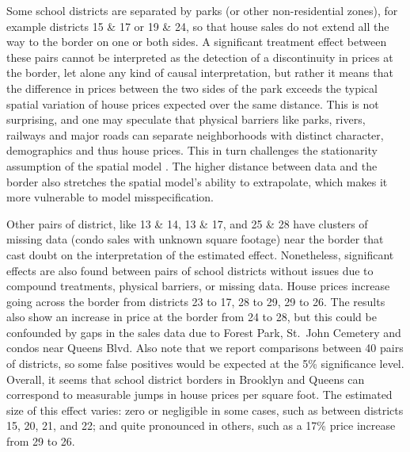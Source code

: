    Some school districts are separated by parks (or other non-residential zones), for example districts 15 \& 17 or 19 \& 24, so that house sales do not extend all the way to the border on one or both sides.
A significant treatment effect between these pairs cannot be interpreted as the detection of a discontinuity in prices at the border, let alone any kind of causal interpretation, but rather it means that the difference in prices between the two sides of the park exceeds the typical spatial variation of house prices expected over the same distance.
This is not surprising, and one may speculate that physical barriers like parks, rivers, railways and major roads can separate neighborhoods with distinct character, demographics and thus house prices.
This in turn challenges the stationarity assumption of the spatial model .
The higher distance between data and the border also stretches the spatial model's ability to extrapolate, which makes it more vulnerable to model misspecification.

    Other pairs of district, like 13 \& 14, 13 \& 17, and 25 \& 28 have clusters of missing data (condo sales with unknown square footage) near the border that cast doubt on the interpretation of the estimated effect.
Nonetheless, significant effects are also found between pairs of school districts without issues due to compound treatments, physical barriers, or missing data.
House prices increase going across the border from districts 23 to 17, 28 to 29, 29 to 26.
The results also show an increase in price at the border from 24 to 28, but this could be confounded by gaps in the sales data due to Forest Park, St.~John Cemetery and condos near Queens Blvd.
Also note that we report comparisons between 40 pairs of districts, so some false positives would be expected at the 5\% significance level.
Overall, it seems that school district borders in Brooklyn and Queens can correspond to measurable jumps in house prices per square foot.
The estimated size of this effect varies: zero or negligible in some cases, such as between districts 15, 20, 21, and 22; and quite pronounced in others, such as a 17\% price increase from 29 to 26.

